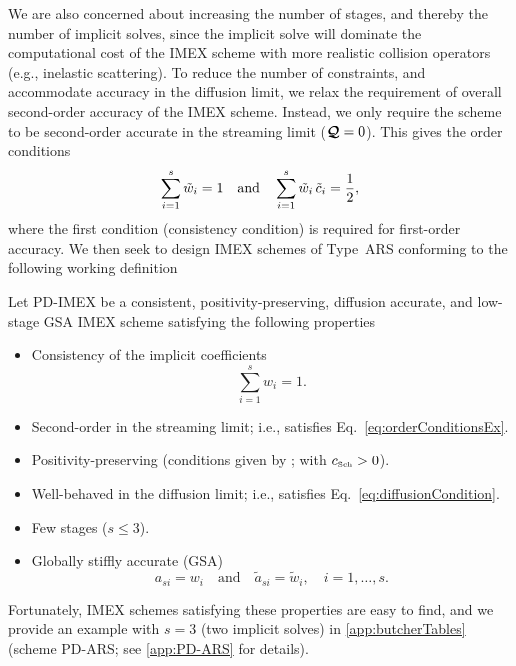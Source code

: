We are also concerned about increasing the number of stages, and thereby the number of implicit solves, since the implicit solve will dominate the computational cost of the IMEX scheme with more realistic collision operators (e.g., inelastic scattering).  
To reduce the number of constraints, and accommodate accuracy in the diffusion limit, we relax the requirement of overall second-order accuracy of the IMEX scheme.  
Instead, we only require the scheme to be second-order accurate in the streaming limit ($\boldsymbol{\mathcal{Q}}=0$).  
This gives the order conditions
\begin{equation}
  \sum_{i=1}^{s}\tilde{w}_{i}=1
  \quad\text{and}\quad
  \sum_{i=1}^{s}\tilde{w}_{i}\,\tilde{c}_{i}=\frac{1}{2},
  \label{eq:orderConditionsEx}
\end{equation}
where the first condition (consistency condition) is required for first-order accuracy.  
We then seek to design IMEX schemes of Type~ARS conforming to the following working definition
\begin{define}
  Let PD-IMEX be a consistent, positivity-preserving, diffusion accurate, and low-stage GSA IMEX scheme satisfying the following properties
  \begin{itemize}
    \item Consistency of the implicit coefficients
    \begin{equation*}
      \sum_{i=1}^{s}w_{i}=1.
    \end{equation*}
    \item Second-order in the streaming limit; i.e., satisfies Eq.~\eqref{eq:orderConditionsEx}.
    \item Positivity-preserving (conditions given by \cite{hu_etal_2018}; with $c_{\mbox{\tiny Sch}}>0$).
    \item Well-behaved in the diffusion limit; i.e., satisfies Eq.~\eqref{eq:diffusionCondition}.
    \item Few stages ($s\le3$).
    \item Globally stiffly accurate (GSA)
    \begin{equation*}
      a_{si}=w_{i}\quad\text{and}\quad\tilde{a}_{si}=\tilde{w}_{i},\quad i=1,\ldots,s.
    \end{equation*}
  \end{itemize}
  \label{def:DIMEXP}
\end{define}
Fortunately, IMEX schemes satisfying these properties are easy to find, and we provide an example with $s=3$ (two implicit solves) in \ref{app:butcherTables} (scheme PD-ARS; see \ref{app:PD-ARS} for details).  
